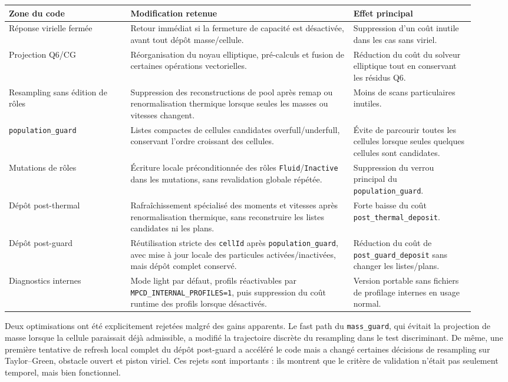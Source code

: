 \documentclass[11pt,a4paper]{article}
\begin{document}
\begin{center}
\small
\begin{tabular}{p{0.24\linewidth}p{0.44\linewidth}p{0.24\linewidth}}
\toprule
Zone du code & Modification retenue & Effet principal \\
\midrule
Réponse virielle fermée & Retour immédiat si la fermeture de capacité est désactivée, avant tout dépôt masse/cellule. & Suppression d'un coût inutile dans les cas sans viriel. \\
Projection Q6/CG & Réorganisation du noyau elliptique, pré-calculs et fusion de certaines opérations vectorielles. & Réduction du coût du solveur elliptique tout en conservant les résidus Q6. \\
Resampling sans édition de rôles & Suppression des reconstructions de pool après remap ou renormalisation thermique lorsque seules les masses ou vitesses changent. & Moins de scans particulaires inutiles. \\
\texttt{population\_guard} & Listes compactes de cellules candidates overfull/underfull, conservant l'ordre croissant des cellules. & Évite de parcourir toutes les cellules lorsque seules quelques cellules sont candidates. \\
Mutations de rôles & Écriture locale préconditionnée des rôles \texttt{Fluid}/\texttt{Inactive} dans les mutations, sans revalidation globale répétée. & Suppression du verrou principal du \texttt{population\_guard}. \\
Dépôt post-thermal & Rafraîchissement spécialisé des moments et vitesses après renormalisation thermique, sans reconstruire les listes candidates ni les plans. & Forte baisse du coût \texttt{post\_thermal\_deposit}. \\
Dépôt post-guard & Réutilisation stricte des \texttt{cellId} après \texttt{population\_guard}, avec mise à jour locale des particules activées/inactivées, mais dépôt complet conservé. & Réduction du coût de \texttt{post\_guard\_deposit} sans changer les listes/plans. \\
Diagnostics internes & Mode light par défaut, profils réactivables par \texttt{MPCD\_INTERNAL\_PROFILES=1}, puis suppression du coût runtime des profils lorsque désactivés. & Version portable sans fichiers de profilage internes en usage normal. \\
\bottomrule
\end{tabular}
\end{center}

Deux optimisations ont été explicitement rejetées malgré des gains apparents. Le fast path du \texttt{mass\_guard}, qui évitait la projection de masse lorsque la cellule paraissait déjà admissible, a modifié la trajectoire discrète du resampling dans le test discriminant. De même, une première tentative de refresh local complet du dépôt post-guard a accéléré le code mais a changé certaines décisions de resampling sur Taylor--Green, obstacle ouvert et piston viriel. Ces rejets sont importants : ils montrent que le critère de validation n'était pas seulement temporel, mais bien fonctionnel.
\end{document}
